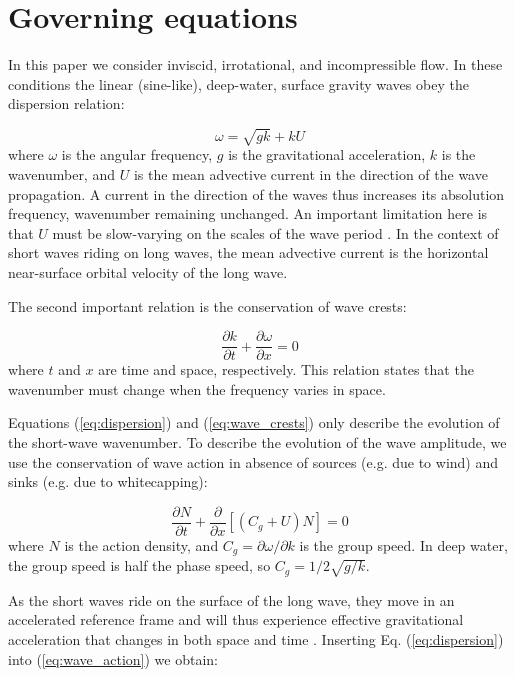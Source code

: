 \documentclass[draft]{agujournal2019}
\begin{document}
\section{Governing equations}

In this paper we consider inviscid, irrotational, and incompressible flow.
In these conditions the linear (sine-like), deep-water, surface gravity waves
obey the dispersion relation:

\begin{equation}
\label{eq:dispersion}
\omega = \sqrt{gk} + k U
\end{equation}
where $\omega$ is the angular frequency, $g$ is the gravitational acceleration,
$k$ is the wavenumber, and $U$ is the mean advective current in the direction
of the wave propagation.
A current in the direction of the waves thus increases its absolution frequency,
wavenumber remaining unchanged.
An important limitation here is that $U$ must be slow-varying on the scales of
the wave period \cite{bretherton1968wavetrains}.
In the context of short waves riding on long waves, the mean advective current
is the horizontal near-surface orbital velocity of the long wave.

The second important relation is the conservation of wave crests:

\begin{equation}
\label{eq:wave_crests}
\dfrac{\partial k}{\partial t}
+ \dfrac{\partial \omega}{\partial x}
= 0
\end{equation}
where $t$ and $x$ are time and space, respectively.
This relation states that the wavenumber must change when the frequency varies
in space.

Equations (\ref{eq:dispersion}) and (\ref{eq:wave_crests}) only describe the
evolution of the short-wave wavenumber.
To describe the evolution of the wave amplitude, we use the conservation of wave
action in absence of sources (e.g. due to wind) and sinks (e.g. due to whitecapping):

\begin{equation}
\label{eq:wave_action}
\dfrac{\partial N}{\partial t}
+ \dfrac{\partial}{\partial x} \left[\left(C_g + U\right)N\right]
= 0
\end{equation}
where $N$ is the action density, and $C_g = \partial \omega / \partial k$ is the
group speed.
In deep water, the group speed is half the phase speed, so $C_g = 1/2\sqrt{g/k}$.

As the short waves ride on the surface of the long wave,
they move in an accelerated reference frame and will thus experience effective
gravitational acceleration that changes in both space and time \cite{longuet1986eulerian,longuet1987propagation}.
Inserting Eq. (\ref{eq:dispersion}) into (\ref{eq:wave_action}) we obtain:
\end{document}
